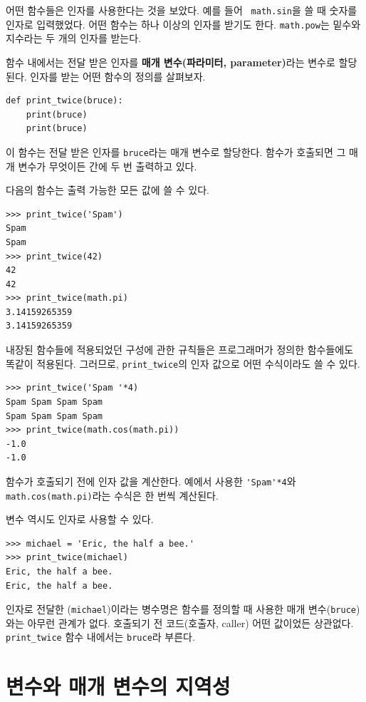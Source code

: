 \documentclass[10pt]{book}
\begin{document}
어떤 함수들은 인자를 사용한다는 것을 보았다.  예를 들어 {\tt
  math.sin}을 쓸 때 숫자를 인자로 입력했었다.  어떤 함수는 하나 이상의
인자를 받기도 한다.  {\tt math.pow}는 밑수와 지수라는 두 개의 인자를
받는다.

함수 내에서는 전달 받은 인자를 {\bf 매개 변수(파라미터, parameter)}라는
변수로 할당된다.  인자를 받는 어떤 함수의 정의를 살펴보자.

\begin{verbatim}
def print_twice(bruce):
    print(bruce)
    print(bruce)
\end{verbatim}
%
이 함수는 전달 받은 인자를 {\tt bruce}라는 매개 변수로 할당한다.
함수가 호출되면 그 매개 변수가 무엇이든 간에 두 번 출력하고 있다.

다음의 함수는 출력 가능한 모든 값에 쓸 수 있다. 

\begin{verbatim}
>>> print_twice('Spam')
Spam
Spam
>>> print_twice(42)
42
42
>>> print_twice(math.pi)
3.14159265359
3.14159265359
\end{verbatim}
%
내장된 함수들에 적용되었던 구성에 관한 규칙들은 프로그래머가 정의한
함수들에도 똑같이 적용된다.   그러므로, \verb"print_twice"의 인자
값으로 어떤 수식이라도 쓸 수 있다.

\begin{verbatim}
>>> print_twice('Spam '*4)
Spam Spam Spam Spam
Spam Spam Spam Spam
>>> print_twice(math.cos(math.pi))
-1.0
-1.0
\end{verbatim}
%
함수가 호출되기 전에 인자 값을 계산한다.  예에서 사용한 \verb"'Spam'*4"와 
{\tt math.cos(math.pi)}라는 수식은 한 번씩 계산된다.

변수 역시도 인자로 사용할 수 있다.

\begin{verbatim}
>>> michael = 'Eric, the half a bee.'
>>> print_twice(michael)
Eric, the half a bee.
Eric, the half a bee.
\end{verbatim}
%
인자로 전달한 ({\tt michael})이라는 병수명은 함수를 정의할 때 사용한
매개 변수({\tt bruce})와는 아무런 관계가 없다.  호출되기 전 코드(호출자, caller) 어떤
값이었든 상관없다.  \verb"print_twice" 함수 내에서는 {\tt bruce}라
부른다.


\section{변수와 매개 변수의 지역성}
\end{document}
